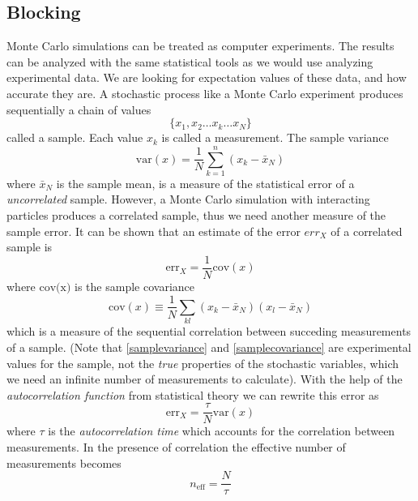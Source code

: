 \documentclass[english, a4paper]{article}
\begin{document}
\subsection{Blocking}

Monte Carlo simulations can be treated as computer experiments. The results can be analyzed with the same
statistical tools as we would use analyzing experimental data. We are looking for expectation values
of these data, and how accurate they are.
A stochastic process like a Monte Carlo experiment produces sequentially a chain of values
\begin{equation}
 \{x_1, x_2 \dots x_k \dots x_N \}
\end{equation}
called a sample. Each value $x_k$ is called a measurement. The sample variance
\begin{equation}
 \textrm{var}(x) = \frac{1}{N} \sum_{k=1}^n (x_k - \bar{x}_N)
 \label{samplevariance}
\end{equation}
where $\bar{x}_N$ is the sample mean, is a measure of the statistical error of a \textit{uncorrelated} sample.
However, a Monte Carlo simulation with interacting particles produces a correlated sample, 
thus we need another measure of the sample error.
It can be shown that an estimate of the error $err_X$ 
of a correlated sample is
\begin{equation}
 \textrm{err}_X = \frac{1}{N} \textrm{cov}(x)
\end{equation}
where $\textrm{cov(x)}$  is the sample covariance
\begin{equation}
 \textrm{cov}(x) \equiv \frac{1}{N} \sum_{kl} (x_k - \bar{x}_N) (x_l - \bar{x}_N)
 \label{samplecovariance}
\end{equation}
which is a measure of the sequential correlation between succeding measurements of a sample.
(Note that \eqref{samplevariance} and \eqref{samplecovariance}
are experimental values for the sample, not the \textit{true} properties of
the stochastic variables, which we need an infinite number of measurements to calculate).
With the help of the \textit{autocorrelation function} from statistical theory we can rewrite
this error as
\begin{equation}
 \textrm{err}_X = \frac{\tau}{N} \textrm{var}(x)
\end{equation}
where $\tau$ is the \textit{autocorrelation time} which accounts
for the correlation between measurements. In the presence of
correlation the effective number of measurements becomes
\begin{equation}
 n_{\textrm{eff}} = \frac{N}{\tau}
\end{equation}
\end{document}
